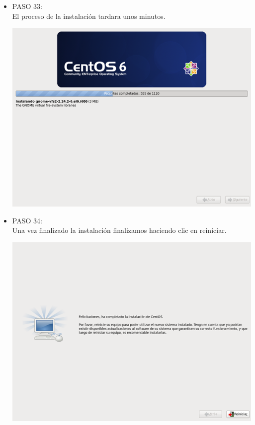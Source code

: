 \begin{itemize}
\item PASO 33:
\\El proceso de la instalación tardara unos minutos.
		\begin{center}
		\includegraphics[width=13cm]{./Imagenes/33}
		\end{center}
	
	\end{itemize} 

\begin{itemize}
\item PASO 34:
\\Una vez finalizado la instalación finalizamos haciendo clic en reiniciar.
		\begin{center}
		\includegraphics[width=13cm]{./Imagenes/34}
		\end{center}
	\\\
	\end{itemize} 


